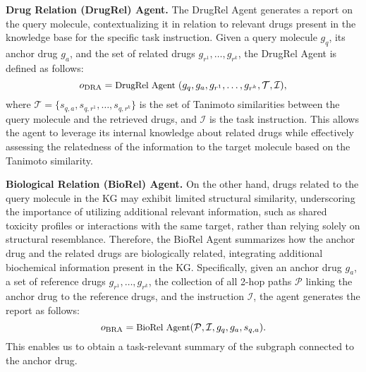 \noindent \textbf{Drug Relation (DrugRel) Agent.}
The DrugRel Agent generates a report on the query molecule, contextualizing it in relation to relevant drugs present in the knowledge base for the specific task instruction.
Given a query molecule $g_q$, its anchor drug $g_{a}$, and the set of related drugs $g_{r^{1}}, \ldots, g_{r^{k}}$,
the DrugRel Agent is defined as follows: %
\begin{equation} 
\small
    o_{\text{DRA}} = \text{DrugRel Agent}~(g_q, g_{a}, g_{r^{1}}, \ldots, g_{r^{k}}, \mathcal{T}, \mathcal{I}),
\end{equation}
where $\mathcal{T} = \{s_{q,a}, s_{q, r^{1}}, \ldots,  s_{q, r^{k}}\}$ is the set of Tanimoto similarities between the query molecule and the retrieved drugs, and $\mathcal{I}$ is the task instruction.
This allows the agent to leverage its internal knowledge about related drugs while effectively assessing the relatedness of the information to the target molecule based on the Tanimoto similarity.

\noindent \textbf{Biological Relation (BioRel) Agent.}
On the other hand, drugs related to the query molecule in the KG may exhibit limited structural similarity, underscoring the importance of utilizing additional relevant information, such as shared toxicity profiles or interactions with the same target, rather than relying solely on structural resemblance.
Therefore, the BioRel Agent summarizes how the anchor drug and the related drugs are biologically related, integrating additional biochemical information present in the KG.
Specifically, given an anchor drug $g_{a}$, a set of reference drugs $g_{r^{1}}, \ldots, g_{r^{k}}$, the collection of all 2-hop paths $\mathcal{P}$ linking the anchor drug to the reference drugs, and the instruction $\mathcal{I}$, the agent generates the report as follows:
\begin{equation} 
\small
    o_{\text{BRA}} = \text{BioRel Agent}(\mathcal{P}, \mathcal{I}, g_q, g_{a}, s_{q,a}).
    \vspace{-5pt}
\end{equation}
This enables us to obtain a task-relevant summary of the subgraph connected to the anchor drug. %

